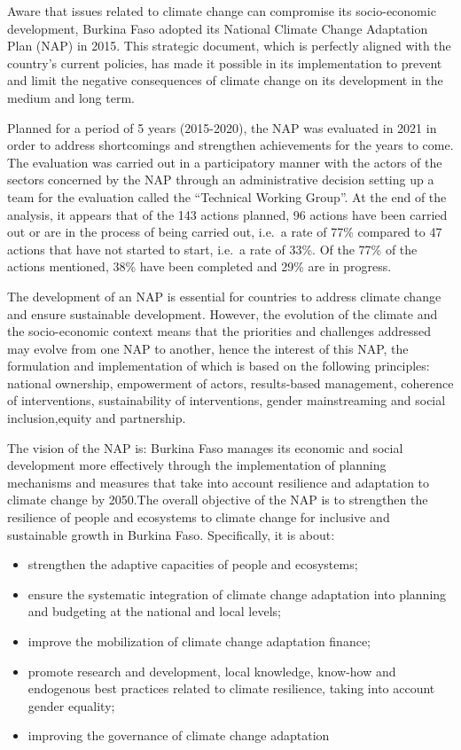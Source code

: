 \documentclass[
]{book}
\begin{document}
Aware that issues related to climate change can compromise its socio-economic development, Burkina Faso adopted its National Climate Change Adaptation Plan (NAP) in 2015. This strategic document, which is perfectly aligned with the country's current policies, has made it possible in its implementation to prevent and limit the negative consequences of climate change on its development in the medium and long term.

Planned for a period of 5 years (2015-2020), the NAP was evaluated in 2021 in order to address shortcomings and strengthen achievements for the years to come. The evaluation was carried out in a participatory manner with the actors of the sectors concerned by the NAP through an administrative decision setting up a team for the evaluation called the ``Technical Working Group''. At the end of the analysis, it appears that of the 143 actions planned, 96 actions have been carried out or are in the process of being carried out, i.e.~a rate of 77\% compared to 47 actions that have not started to start, i.e.~a rate of 33\%. Of the 77\% of the actions mentioned, 38\% have been completed and 29\% are in progress.

The development of an NAP is essential for countries to address climate change and ensure sustainable development. However, the evolution of the climate and the socio-economic context means that the priorities and challenges addressed may evolve from one NAP to another, hence the interest of this NAP, the formulation and implementation of which is based on the following principles: national ownership, empowerment of actors, results-based management, coherence of interventions, sustainability of interventions, gender mainstreaming and social inclusion,equity and partnership.

The vision of the NAP is: Burkina Faso manages its economic and social development more effectively through the implementation of planning mechanisms and measures that take into account resilience and adaptation to climate change by 2050.The overall objective of the NAP is to strengthen the resilience of people and ecosystems to climate change for inclusive and sustainable growth in Burkina Faso. Specifically, it is about:

\begin{itemize}
\item
  strengthen the adaptive capacities of people and ecosystems;
\item
  ensure the systematic integration of climate change adaptation into planning and budgeting at the national and local levels;
\item
  improve the mobilization of climate change adaptation finance;
\item
  promote research and development, local knowledge, know-how and endogenous best practices related to climate resilience, taking into account gender equality;
\item
  improving the governance of climate change adaptation
\end{itemize}
\end{document}

